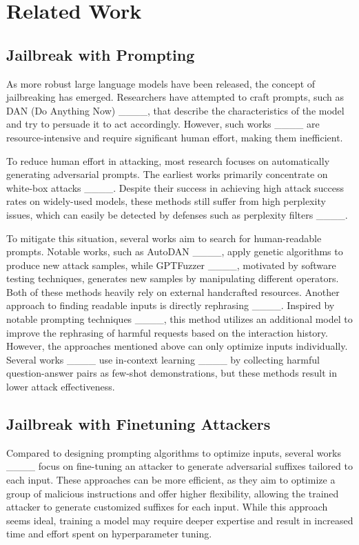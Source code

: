 \section{Related Work}
\subsection{Jailbreak with Prompting}
\label{sec:prompt}

As more robust large language models have been released, the concept of jailbreaking has emerged. Researchers have attempted to craft prompts, such as DAN (Do Anything Now) ____, that describe the characteristics of the model and try to persuade it to act accordingly. However, such works ____ are resource-intensive and require significant human effort, making them inefficient.

To reduce human effort in attacking, most research focuses on automatically generating adversarial prompts. The earliest works primarily concentrate on white-box attacks ____. Despite their success in achieving high attack success rates on widely-used models, these methods still suffer from high perplexity issues, which can easily be detected by defenses such as perplexity filters ____.
 
To mitigate this situation, several works aim to search for human-readable prompts. Notable works, such as AutoDAN ____, apply genetic algorithms to produce new attack samples, while GPTFuzzer ____, motivated by software testing techniques, generates new samples by manipulating different operators. Both of these methods heavily rely on external handcrafted resources. Another approach to finding readable inputs is directly rephrasing ____. Inspired by notable prompting techniques ____, this method utilizes an additional model to improve the rephrasing of harmful requests based on the interaction history. However, the approaches mentioned above can only optimize inputs individually. Several works ____ use in-context learning ____ by collecting harmful question-answer pairs as few-shot demonstrations, but these methods result in lower attack effectiveness.

\subsection{Jailbreak with Finetuning Attackers}
Compared to designing prompting algorithms to optimize inputs, several works ____ focus on fine-tuning an attacker to generate adversarial suffixes tailored to each input. These approaches can be more efficient, as they aim to optimize a group of malicious instructions and offer higher flexibility, allowing the trained attacker to generate customized suffixes for each input. While this approach seems ideal, training a model may require deeper expertise and result in increased time and effort spent on hyperparameter tuning.

